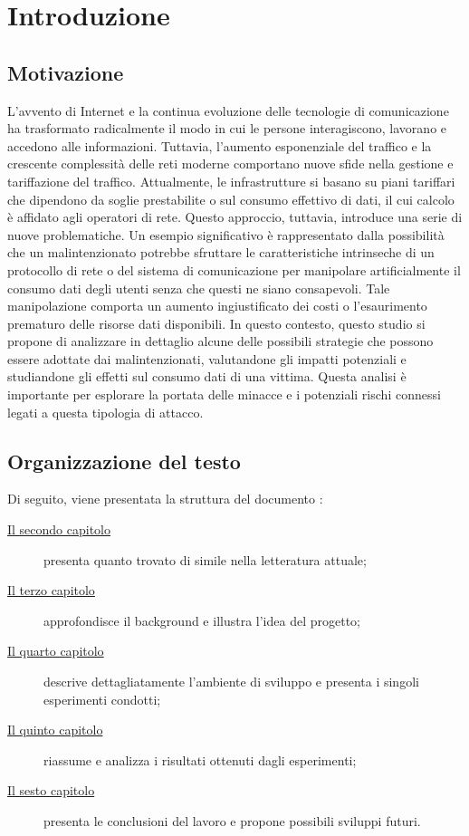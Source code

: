 \chapter{Introduzione}
\label{cap:introduzione}

\section{Motivazione}
L'avvento di Internet e la continua evoluzione delle tecnologie di comunicazione ha trasformato radicalmente il modo in cui le persone interagiscono, lavorano e accedono alle informazioni.
Tuttavia, l'aumento esponenziale del traffico e la crescente complessità delle reti moderne comportano nuove sfide nella gestione e tariffazione del traffico.
Attualmente, le infrastrutture si basano su piani tariffari che dipendono da soglie prestabilite o sul consumo effettivo di dati, il cui calcolo è affidato agli operatori di rete.
Questo approccio, tuttavia, introduce una serie di nuove problematiche. Un esempio significativo è rappresentato 
dalla possibilità che un malintenzionato potrebbe sfruttare le caratteristiche intrinseche di un protocollo di rete o del sistema di comunicazione 
per manipolare artificialmente il consumo dati degli utenti senza che questi ne siano consapevoli.
Tale manipolazione comporta un aumento ingiustificato dei costi o l'esaurimento prematuro delle risorse dati disponibili.
In questo contesto, questo studio si propone di analizzare in dettaglio alcune delle possibili strategie che possono essere adottate dai malintenzionati, 
valutandone gli impatti potenziali e studiandone gli effetti sul consumo dati di una vittima. 
Questa analisi è importante per esplorare la portata delle minacce e i potenziali rischi connessi legati a questa tipologia di attacco.
\section{Organizzazione del testo}
\indent Di seguito, viene presentata la struttura del documento :
\begin{description}
    \item[{\hyperref[cap:RelatedWorks]{Il secondo capitolo}}] presenta quanto trovato di simile nella letteratura attuale;

    \item[{\hyperref[cap:descrizione]{Il terzo capitolo}}] approfondisce il background e illustra l'idea del progetto;
    
    \item[{\hyperref[cap:processi-metodologie]{Il quarto capitolo}}] descrive dettagliatamente l'ambiente di sviluppo e presenta i singoli esperimenti condotti;

    \item[{\hyperref[cap:risultati]{Il quinto capitolo}}] riassume e analizza i risultati ottenuti dagli esperimenti;
    
    \item[{\hyperref[cap:conclusioni]{Il sesto capitolo}}] presenta le conclusioni del lavoro e propone possibili sviluppi futuri.
\end{description}
